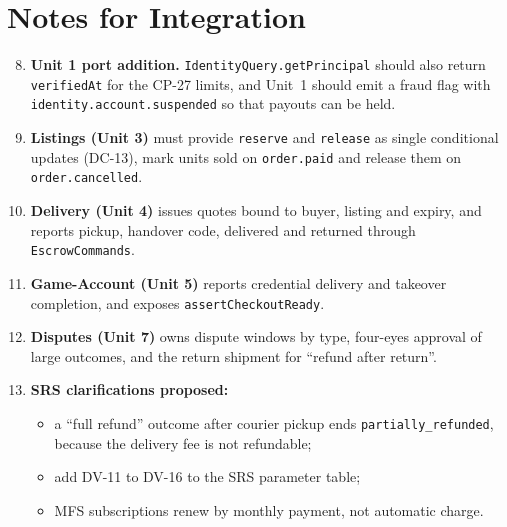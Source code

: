 \documentclass[11pt,a4paper]{article}
\begin{document}
\section{Notes for Integration}
\label{sec:notes}
\begin{enumerate}[label=\textbf{I-\arabic*}, leftmargin=*, nosep]
  \setcounter{enumi}{7}
  \item \textbf{Unit 1 port addition.} \texttt{IdentityQuery.getPrincipal} should also return \texttt{verifiedAt} for the CP-27 limits, and Unit~1 should emit a fraud flag with \texttt{identity.account.suspended} so that payouts can be held.
  \item \textbf{Listings (Unit 3)} must provide \texttt{reserve} and \texttt{release} as single conditional updates (DC-13), mark units sold on \texttt{order.paid} and release them on \texttt{order.cancelled}.
  \item \textbf{Delivery (Unit 4)} issues quotes bound to buyer, listing and expiry, and reports pickup, handover code, delivered and returned through \texttt{EscrowCommands}.
  \item \textbf{Game-Account (Unit 5)} reports credential delivery and takeover completion, and exposes \texttt{assertCheckoutReady}.
  \item \textbf{Disputes (Unit 7)} owns dispute windows by type, four-eyes approval of large outcomes, and the return shipment for ``refund after return''.
  \item \textbf{SRS clarifications proposed:}
  \begin{itemize}[nosep]
    \item a ``full refund'' outcome after courier pickup ends \texttt{partially\_refunded}, because the delivery fee is not refundable;
    \item add DV-11 to DV-16 to the SRS parameter table;
    \item MFS subscriptions renew by monthly payment, not automatic charge.
  \end{itemize}
\end{enumerate}

\appendix
\end{document}
